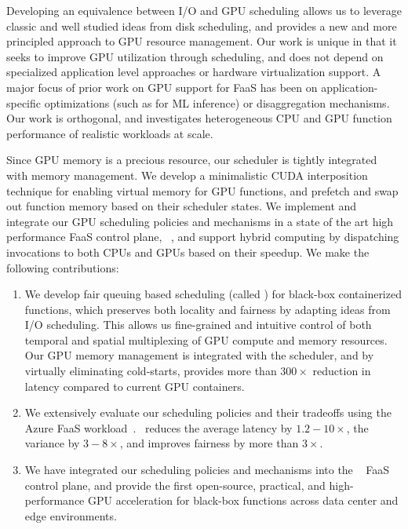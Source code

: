 Developing an equivalence between I/O and GPU scheduling allows us to leverage classic and well studied ideas from disk scheduling, and provides a new and more principled approach to GPU resource management. 
Our work is unique in that it seeks to improve GPU utilization through scheduling, and does not depend on specialized application level approaches or hardware virtualization support. 
A major focus of prior work on GPU support for FaaS has been on application-specific optimizations (such as for ML inference) or disaggregation mechanisms.
Our work is orthogonal, and investigates heterogeneous CPU and GPU function performance of realistic workloads at scale.

Since GPU memory is a precious resource, our scheduler is tightly integrated with memory management.
We develop a minimalistic CUDA interposition technique for enabling virtual memory for GPU functions, and prefetch and swap out function memory based on their scheduler states.
We implement and integrate our GPU scheduling policies and mechanisms in a state of the art high performance FaaS control plane, \sysname~\cite{fuerst2023iluvatar}, and support hybrid computing by dispatching invocations to both CPUs and GPUs based on their speedup. 
We make the following contributions:
\begin{enumerate}[leftmargin=*]
\item We develop fair queuing based scheduling (called \quotes{\QName}) for black-box containerized functions, which preserves both locality and fairness by adapting ideas from I/O scheduling.
This allows us fine-grained and intuitive control of both temporal and spatial multiplexing of GPU compute and memory resources.
Our GPU memory management is integrated with the scheduler, and by virtually eliminating cold-starts, provides more than $300\times$ reduction in latency compared to current GPU containers.

\item We extensively evaluate our scheduling policies and their tradeoffs using the Azure FaaS workload~\cite{shahrad2020serverless}.
  \QName~reduces the average latency by $1.2-10\times$, the variance by $3-8\times$, and improves fairness by more than $3\times$.
  
\item We have integrated our scheduling policies and mechanisms into the \sysname~\cite{fuerst2023iluvatar} FaaS control plane, and provide the first open-source, practical, and high-performance GPU acceleration for black-box functions across data center and edge environments. 
\end{enumerate}



